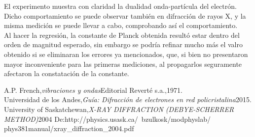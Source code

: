 \documentclass[%
 reprint,
 amsmath,amssymb,
 aps,
]{revtex4-1}
\begin{document}
El experimento muestra con claridad la dualidad onda-partícula del electrón. Dicho comportamiento se puede observar también en difracción de rayos X, y la misma medición se puede llevar a cabo, comprobando así el comportamiento. \\

Al hacer la regresión, la constante de Planck obtenida resultó estar dentro del orden de magnitud esperado, sin embargo se podría refinar mucho más el valro obtenido si se eliminaran los errores ya mencionados, que, si bien no presentaron mayor inconveniente para las primeras mediciones, al propagarlos seguramente afectaron la constatación de la constante. \\


\begin{thebibliography}{99} 
 A.P. French,{\it vibraciones y ondas}{Editorial Reverté s.a.,1971}.\\ 
 Universidad de los Andes,{\it Guía: Difracción de electrones en red policristalina}{2015}.\\
\bibitem{} University of Saskatchewan,{\it X-RAY DIFFRACTION (DEBYE-SCHERRER METHOD)}{2004}
{De:http://physics.usask.ca/~bzulkosk/modphyslab/\\phys381manual/xray\_diffraction\_2004.pdf}\\
\end{thebibliography}
\end{document}
